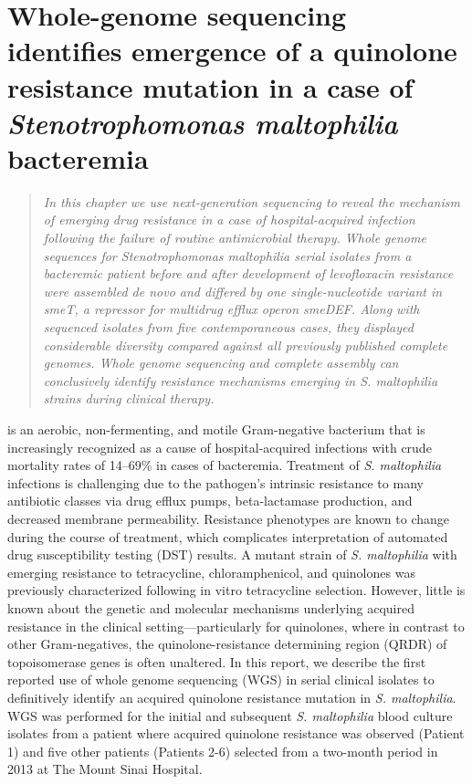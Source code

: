 
\chapter{Whole-genome sequencing identifies emergence of a quinolone resistance mutation in a case of \emph{Stenotrophomonas maltophilia} bacteremia}
\label{chap:steno}


\begin{quote}
\emph{In this chapter we use next-generation sequencing to reveal the mechanism of emerging drug resistance in a case of hospital-acquired infection following the failure of routine antimicrobial therapy. Whole genome sequences for \emph{Stenotrophomonas maltophilia} serial isolates from a bacteremic patient before and after development of levofloxacin resistance were assembled \emph{de novo} and differed by one single-nucleotide variant in \emph{smeT}, a repressor for multidrug efflux operon \emph{smeDEF}. Along with sequenced isolates from five contemporaneous cases, they displayed considerable diversity compared against all previously published complete genomes. Whole genome sequencing and complete assembly can conclusively identify resistance mechanisms emerging in \emph{S. maltophilia} strains during clinical therapy.}
\end{quote}

 is an aerobic, non-fermenting, and motile Gram-negative bacterium that is increasingly recognized as a cause of hospital-acquired infections with crude mortality rates of 14–69\% in cases of bacteremia.\autocite{Brooke2012} Treatment of \emph{S. maltophilia} infections is challenging due to the pathogen’s intrinsic resistance to many antibiotic classes via drug efflux pumps, beta-lactamase production, and decreased membrane permeability.\autocite{Brooke2012} Resistance phenotypes are known to change during the course of treatment, which complicates interpretation of automated drug susceptibility testing (DST) results.\autocite{Garrison1996} A mutant strain of \emph{S. maltophilia} with emerging resistance to tetracycline, chloramphenicol, and quinolones was previously characterized following in vitro tetracycline selection.\autocite{Alonso1997,Sanchez2002} However, little is known about the genetic and molecular mechanisms underlying acquired resistance in the clinical setting—particularly for quinolones, where in contrast to other Gram-negatives, the quinolone-resistance determining region (QRDR) of topoisomerase genes is often unaltered.\autocite{Valdezate2005} In this report, we describe the first reported use of whole genome sequencing (WGS) in serial clinical isolates to definitively identify an acquired quinolone resistance mutation in \emph{S. maltophilia}. WGS was performed for the initial and subsequent \emph{S. maltophilia} blood culture isolates from a patient where acquired quinolone resistance was observed (Patient 1) and five other patients (Patients 2-6) selected from a two-month period in 2013 at The Mount Sinai Hospital. 

